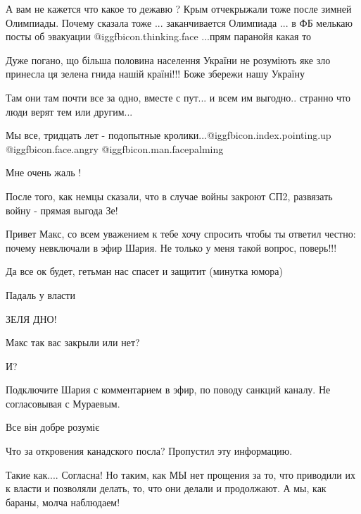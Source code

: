 \begin{itemize}

А вам не кажется что какое то дежавю ? Крым отчекрыжали тоже после зимней
Олимпиады. Почему сказала тоже ... заканчивается Олимпиада ... в ФБ мелькаю
посты об эвакуации  @igg{fbicon.thinking.face} ...прям паранойя какая то



Дуже погано, що більша половина населення України не розуміють яке зло принесла
ця зелена гнида нашій країні!!! Боже збережи нашу Україну


Там они там почти все за одно, вместе с пут... и всем им выгодно.. странно что
люди верят тем или другим...

Мы все, тридцать лет - подопытные кролики...@igg{fbicon.index.pointing.up}
@igg{fbicon.face.angry}  @igg{fbicon.man.facepalming} 


Мне очень жаль !

После того, как немцы сказали, что в случае войны закроют СП2, развязать войну - прямая выгода Зе!


Привет Макс, со всем уважением к тебе хочу спросить чтобы ты ответил честно:
почему невключали в эфир Шария. Не только у меня такой вопрос, поверь!!!


Да все ок будет, гетьман нас спасет и защитит (минутка юмора)

Падаль у власти

ЗЕЛЯ ДНО!

Макс так вас закрыли или нет?

И?

Подключите Шария с комментарием в эфир, по поводу санкций каналу. Не согласовывая с Мураевым.

Все він добре розуміє

Что за откровения канадского посла? Пропустил эту информацию.


Такие как.... Согласна! Но таким, как МЫ нет прощения за то, что приводили их к
власти и позволяли делать, то, что они делали и продолжают. А мы, как бараны, молча
наблюдаем!



\end{itemize}
